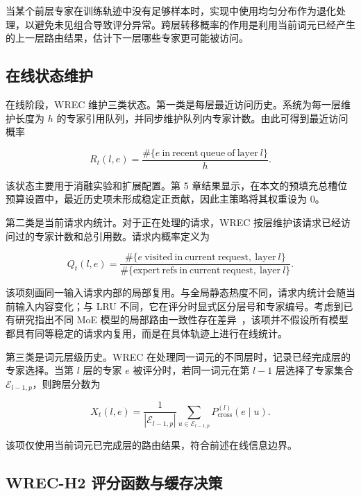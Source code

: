 当某个前层专家在训练轨迹中没有足够样本时，实现中使用均匀分布作为退化处理，以避免未见组合导致评分异常。跨层转移概率的作用是利用当前词元已经产生的上一层路由结果，估计下一层哪些专家更可能被访问。

\subsection{在线状态维护}

在线阶段，WREC 维护三类状态。第一类是每层最近访问历史。系统为每一层维护长度为 $h$ 的专家引用队列，并同步维护队列内专家计数。由此可得到最近访问概率

\begin{equation}
    \label{equ:wrec-recent-prob}
    R_t(l,e)=\frac{\#\{e\ \mathrm{in\ recent\ queue\ of\ layer}\ l\}}{h}.
\end{equation}

该状态主要用于消融实验和扩展配置。第 5 章结果显示，在本文的预填充总槽位预算设置中，最近历史项未形成稳定正贡献，因此主策略将其权重设为 $0$。

第二类是当前请求内统计。对于正在处理的请求，WREC 按层维护该请求已经访问过的专家计数和总引用数。请求内概率定义为

\begin{equation}
    \label{equ:wrec-request-prob}
    Q_t(l,e)=
    \frac{\#\{e\ \mathrm{visited\ in\ current\ request,\ layer}\ l\}}
    {\#\{\mathrm{expert\ refs\ in\ current\ request,\ layer}\ l\}}.
\end{equation}

该项刻画同一输入请求内部的局部复用。与全局静态热度不同，请求内统计会随当前输入内容变化；与 LRU 不同，它在评分时显式区分层号和专家编号。考虑到已有研究指出不同 MoE 模型的局部路由一致性存在差异~\cite{liang2026notallmodels}，该项并不假设所有模型都具有同等稳定的请求内复用，而是在具体轨迹上进行在线统计。

第三类是词元层级历史。WREC 在处理同一词元的不同层时，记录已经完成层的专家选择。当第 $l$ 层的专家 $e$ 被评分时，若同一词元在第 $l-1$ 层选择了专家集合 $\mathcal{E}_{l-1,p}$，则跨层分数为

\begin{equation}
    \label{equ:wrec-cross-score}
    X_t(l,e)=
    \frac{1}{|\mathcal{E}_{l-1,p}|}
    \sum_{u\in \mathcal{E}_{l-1,p}} P_{\mathrm{cross}}^{(l)}(e\mid u).
\end{equation}

该项仅使用当前词元已完成层的路由结果，符合前述在线信息边界。

\subsection{WREC-H2 评分函数与缓存决策}

